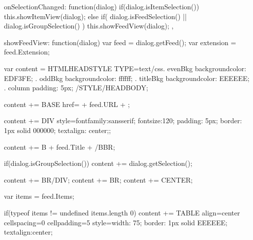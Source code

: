 \documentclass[letterpaper,12pt,english,openany,oneside]{sphinxmanual}
\begin{document}
\begin{sphinxVerbatim}[commandchars=\\\{\}]
           onSelectionChanged: function(dialog)
           \PYGZob{}
               if(dialog.isItemSelection())
                   this.showItemView(dialog);
               else if(
                           dialog.isFeedSelection() ||
                           dialog.isGroupSelection()
               )
                   this.showFeedView(dialog);
           \PYGZcb{},

           showFeedView: function(dialog)
           \PYGZob{}
               var feed = dialog.getFeed();
               var extension = feed.Extension;

               var content = \PYGZdq{}\PYGZlt{}HTML\PYGZgt{}\PYGZlt{}HEAD\PYGZgt{}\PYGZlt{}STYLE TYPE=\PYGZdq{}text/css\PYGZdq{}\PYGZgt{}.
                   evenBkg \PYGZob{}background\PYGZhy{}color: \PYGZsh{}EDF3FE; \PYGZcb{}.
                   oddBkg \PYGZob{}background\PYGZhy{}color: \PYGZsh{}ffffff; \PYGZcb{}.
                   titleBkg \PYGZob{} background\PYGZhy{}color: \PYGZsh{}EEEEEE; \PYGZcb{}.
                   column \PYGZob{} padding: 5px; \PYGZcb{}\PYGZlt{}/STYLE\PYGZgt{}\PYGZlt{}/HEAD\PYGZgt{}\PYGZlt{}BODY\PYGZgt{}\PYGZdq{};

               content += \PYGZdq{}\PYGZlt{}BASE href=\PYGZdq{}\PYGZdq{} + feed.URL + \PYGZdq{}\PYGZdq{}\PYGZgt{}\PYGZdq{};


               content += \PYGZdq{}\PYGZlt{}DIV style=\PYGZdq{}font\PYGZhy{}family:sans\PYGZhy{}serif;
                   font\PYGZhy{}size:120\PYGZpc{};
                   padding: 5px;
                   border: 1px solid \PYGZsh{}000000;
                   text\PYGZhy{}align: center;\PYGZdq{}\PYGZgt{}\PYGZdq{};

               content += \PYGZdq{}\PYGZlt{}B\PYGZgt{}\PYGZdq{} + feed.Title + \PYGZdq{}\PYGZlt{}/B\PYGZgt{}\PYGZlt{}BR\PYGZgt{}\PYGZdq{};

               if(dialog.isGroupSelection())
                   content += dialog.getSelection();

               content += \PYGZdq{}\PYGZlt{}BR\PYGZgt{}\PYGZlt{}/DIV\PYGZgt{}\PYGZdq{};
               content += \PYGZdq{}\PYGZlt{}BR\PYGZgt{}\PYGZdq{};
               content += \PYGZdq{}\PYGZlt{}CENTER\PYGZgt{}\PYGZdq{};

               var items = feed.Items;

               if(typeof items != \PYGZdq{}undefined\PYGZdq{} \PYGZam{}\PYGZam{} items.length \PYGZgt{} 0)
               \PYGZob{}
                   content += \PYGZdq{}\PYGZlt{}TABLE align=center cellspacing=0
                       cellpadding=5 style=\PYGZdq{}width: 75\PYGZpc{};
                       border: 1px solid \PYGZsh{}EEEEEE;
                       text\PYGZhy{}align:center\PYGZdq{}\PYGZgt{}\PYGZdq{};


\end{sphinxVerbatim}
\end{document}

